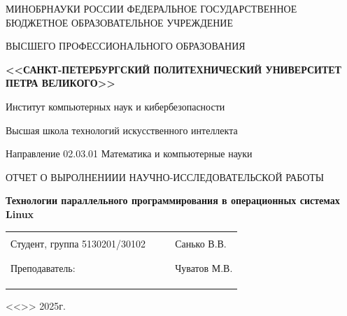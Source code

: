 \documentclass[11pt,a4paper,final]{article}
\begin{document}
	\thispagestyle{empty}
	\begin{center}
		{\normalsize МИНОБРНАУКИ РОССИИ}
		{\normalsize ФЕДЕРАЛЬНОЕ ГОСУДАРСТВЕННОЕ БЮДЖЕТНОЕ ОБРАЗОВАТЕЛЬНОЕ УЧРЕЖДЕНИЕ}
		
		\vspace{7pt}
		
		{\normalsize ВЫСШЕГО ПРОФЕССИОНАЛЬНОГО ОБРАЗОВАНИЯ}
		
		\vspace{3pt}
		
		{\normalsize \bf <<САНКТ-ПЕТЕРБУРГСКИЙ ПОЛИТЕХНИЧЕСКИЙ УНИВЕРСИТЕТ ПЕТРА ВЕЛИКОГО>>}
		
		\vspace{1pt}
		
		{\normalsize Институт компьютерных наук и кибербезопасности}
		
		\vspace{7pt}
		
		{\normalsize Высшая школа технологий искусственного интеллекта}
		
		\vspace{7pt}
		
		{\normalsize Направление 02.03.01 Математика и компьютерные науки}
		
		\vspace{75pt}
		
		{\normalsize ОТЧЕТ О ВЫРОЛНЕНИИИ НАУЧНО-ИССЛЕДОВАТЕЛЬСКОЙ РАБОТЫ}
		
		\vspace{15pt}
		{\Large \bf Технологии параллельного программирования в
			операционных системах Linux \par}
		\vspace{55pt}
		{\normalsize }
		
		\hfill \break
		\hfill \break
	\end{center}
	
	\small{ 
		\begin{tabular}{lrrl}
			\hspace{-1cm}
			\\Студент, группа 5130201/30102 & \hspace{3cm} & \underline{\hspace{3cm}} &Санько В.В. \\\\
			\vspace{17pt}
			\hspace{-1cm}
			\\ Преподаватель: & \hspace{3cm} & \underline{\hspace{3cm}} & Чуватов М.В. \\
			\\\\
			&&\hspace{5cm}
		\end{tabular}
		\begin{flushright}
			<<\underline{\hspace{1cm}}>>\underline{\hspace{2.5cm}} 2025г.
		\end{flushright}
	}
	
\end{document}
